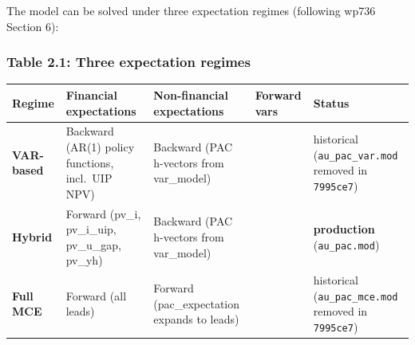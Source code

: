\documentclass[
]{article}
\newcounter{none} %
\begin{document}
The model can be solved under three expectation regimes (following wp736
Section 6):

\subsubsection{Table 2.1: Three expectation
regimes}\label{table-2.1-three-expectation-regimes}

{\def\LTcaptype{none} %
\begin{longtable}[]{@{}
  >{\raggedright\arraybackslash}p{}
  >{\raggedright\arraybackslash}p{}
  >{\raggedright\arraybackslash}p{}
  >{\raggedright\arraybackslash}p{}
  >{\raggedright\arraybackslash}p{}@{}}
\toprule\noalign{}
\begin{minipage}[b]{\linewidth}\raggedright
Regime
\end{minipage} & \begin{minipage}[b]{\linewidth}\raggedright
Financial expectations
\end{minipage} & \begin{minipage}[b]{\linewidth}\raggedright
Non-financial expectations
\end{minipage} & \begin{minipage}[b]{\linewidth}\raggedright
Forward vars
\end{minipage} & \begin{minipage}[b]{\linewidth}\raggedright
Status
\end{minipage} \\
\midrule\noalign{}
\endhead
\bottomrule\noalign{}
\endlastfoot
\textbf{VAR-based} & Backward (AR(1) policy functions, incl.~UIP NPV) &
Backward (PAC h-vectors from var\_model) & 0 & historical
(\texttt{au\_pac\_var.mod} removed in \texttt{7995ce7}) \\
\textbf{Hybrid} & Forward (pv\_i, pv\_i\_uip, pv\_u\_gap, pv\_yh) &
Backward (PAC h-vectors from var\_model) & 4 & \textbf{production}
(\texttt{au\_pac.mod}) \\
\textbf{Full MCE} & Forward (all leads) & Forward (pac\_expectation
expands to leads) & 31 & historical (\texttt{au\_pac\_mce.mod} removed
in \texttt{7995ce7}) \\
\end{longtable}
}
\end{document}
